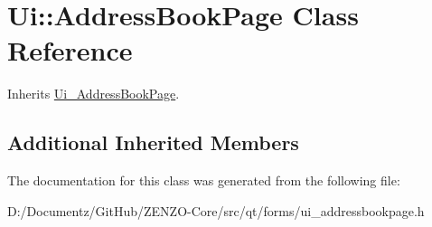 \hypertarget{class_ui_1_1_address_book_page}{}\section{Ui\+::Address\+Book\+Page Class Reference}
\label{class_ui_1_1_address_book_page}


Inherits \mbox{\hyperlink{class_ui___address_book_page}{Ui\+\_\+\+Address\+Book\+Page}}.

\subsection*{Additional Inherited Members}


The documentation for this class was generated from the following file\+:\begin{DoxyCompactItemize}
\item 
D\+:/\+Documentz/\+Git\+Hub/\+Z\+E\+N\+Z\+O-\/\+Core/src/qt/forms/ui\+\_\+addressbookpage.\+h\end{DoxyCompactItemize}
